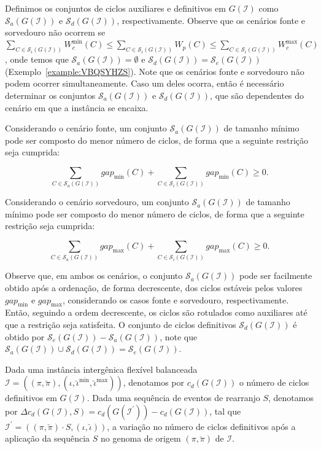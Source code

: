 Definimos os conjuntos de ciclos auxiliares e definitivos em $G(\mathcal{I})$ como $\mathcal{S}_a(G(\mathcal{I}))$ e $\mathcal{S}_d(G(\mathcal{I}))$, respectivamente. Observe que os cenários fonte e sorvedouro não ocorrem se $\sum_{C \in \mathcal{S}_i(G(\mathcal{I}))} W^{\min}_c(C) \le \sum_{C \in \mathcal{S}_i(G(\mathcal{I}))} W_p(C) \le \sum_{C \in \mathcal{S}_i(G(\mathcal{I}))} W^{\max}_c(C)$, onde temos que $\mathcal{S}_a(G(\mathcal{I})) = \emptyset$ e $\mathcal{S}_d(G(\mathcal{I})) = \mathcal{S}_e(G(\mathcal{I}))$ (Exemplo~\ref{example:VBQSYHZS}). Note que os cenários fonte e sorvedouro não podem ocorrer simultaneamente. Caso um deles ocorra, então é necessário determinar os conjuntos $\mathcal{S}_a(G(\mathcal{I}))$ e $\mathcal{S}_d(G(\mathcal{I}))$, que são dependentes do cenário em que a instância se encaixa. 


Considerando o cenário fonte, um conjunto $\mathcal{S}_a(G(\mathcal{I}))$ de tamanho mínimo pode ser composto do menor número de ciclos, de forma que a seguinte restrição seja cumprida: 

$$\sum_{C \in \mathcal{S}_a(G(\mathcal{I}))} gap_{\min}(C) + \sum_{C \in \mathcal{S}_i(G(\mathcal{I}))} gap_{\min}(C) \ge 0.$$

Considerando o cenário sorvedouro, um conjunto $\mathcal{S}_a(G(\mathcal{I}))$ de tamanho mínimo pode ser composto do menor número de ciclos, de forma  que a seguinte restrição seja cumprida: 

$$\sum_{C \in \mathcal{S}_a(G(\mathcal{I}))} gap_{\max}(C) + \sum_{C \in \mathcal{S}_i(G(\mathcal{I}))} gap_{\max}(C) \ge 0.$$

Observe que, em ambos os cenários, o conjunto $\mathcal{S}_a(G(\mathcal{I}))$ pode ser facilmente obtido após a ordenação, de forma decrescente, dos ciclos estáveis pelos valores $gap_{\min}$ e $gap_{\max}$, considerando os casos fonte e sorvedouro, respectivamente. Então, seguindo a ordem decrescente, os ciclos são rotulados como auxiliares até que a restrição seja satisfeita. O conjunto de ciclos definitivos $\mathcal{S}_d(G(\mathcal{I}))$ é obtido por $\mathcal{S}_e(G(\mathcal{I})) - \mathcal{S}_a(G(\mathcal{I}))$, note que $\mathcal{S}_a(G(\mathcal{I})) \cup \mathcal{S}_d(G(\mathcal{I})) = \mathcal{S}_e(G(\mathcal{I}))$.

Dada uma instância intergênica flexível balanceada $\mathcal{I} = ((\pi,\breve\pi),(\iota,\breve\iota^{\min},\breve\iota^{\max}))$, denotamos por $c_d(G(\mathcal{I}))$ o número de ciclos definitivos em $G(\mathcal{I})$. Dada uma sequência de eventos de rearranjo $S$, denotamos por $\Delta c_d(G(\mathcal{I}), S) = c_d(G(\mathcal{I^{\prime}})) - c_d(G(\mathcal{I}))$, tal que $\mathcal{I^{\prime}} = ((\pi,\breve\pi) \cdot S,(\iota,\breve\iota))$, a variação no número de ciclos definitivos após a aplicação da sequência $S$ no genoma de origem $(\pi,\breve\pi)$ de $\mathcal{I}$.

